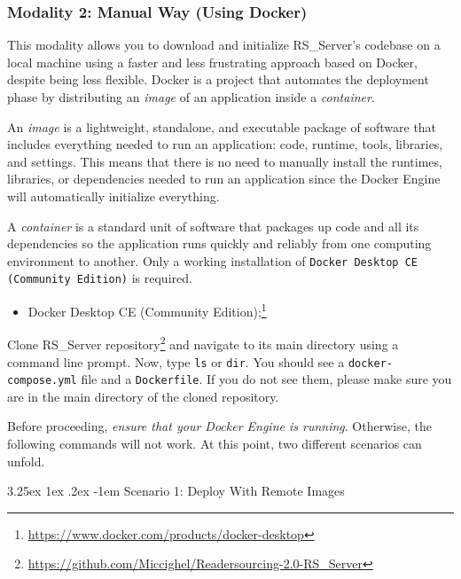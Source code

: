 \documentclass[a4paper, english]{article}
\makeatletter
\newcounter{subsubsubsection}[subsubsection]
\renewcommand\paragraph{\@startsection{paragraph}{5}{\z@}%
  {3.25ex \@plus1ex \@minus.2ex}%
  {-1em}%
  {\normalfont\normalsize\bfseries}}
\newcommand{\rsserver}{RS\_Server\xspace}
\makeatother
\begin{document}
\subsubsection{Modality 2: Manual Way (Using Docker)}

This modality allows you to download and initialize \rsserver's codebase on a local machine using a faster and less frustrating approach based on Docker, despite being less flexible. Docker is a project that automates the deployment phase by distributing an \emph{image} of an application inside a \emph{container}.

An \emph{image} is a lightweight, standalone, and executable package of software that includes everything needed to run an application: code, runtime, tools, libraries, and settings. This means that there is no need to manually install the runtimes, libraries, or dependencies needed to run an application since the Docker Engine will automatically initialize everything.

A \emph{container} is a standard unit of software that packages up code and all its dependencies so the application runs quickly and reliably from one computing environment to another. Only a working installation of \verb|Docker Desktop CE (Community Edition)| is required.


\begin{itemize}
\item Docker Desktop CE (Community Edition);\footnote{\url{https://www.docker.com/products/docker-desktop}}
\end{itemize}


Clone \rsserver repository\footnote{\url{https://github.com/Miccighel/Readersourcing-2.0-RS_Server}} and navigate to its main directory using a command line prompt. Now, type \verb|ls| or \verb|dir|. You should see a \verb|docker-compose.yml| file and a \verb|Dockerfile|. If you do not see them, please make sure you are in the main directory of the cloned repository.

Before proceeding, \emph{ensure that your Docker Engine is running}. Otherwise, the following commands will not work. At this point, two different scenarios can unfold.

\paragraph{Scenario 1: Deploy With Remote Images}
\end{document}
